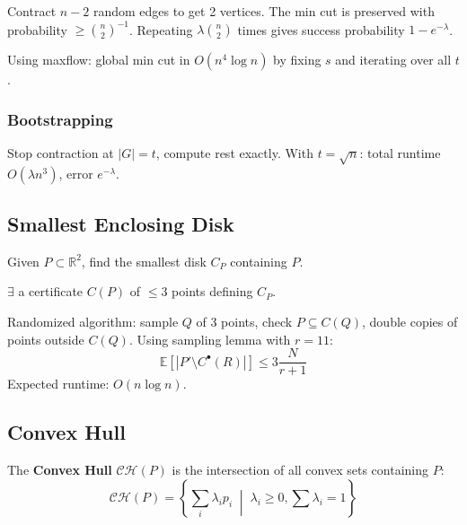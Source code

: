\begin{theorem}
	Contract $n-2$ random edges to get 2 vertices. The min cut is preserved with probability $\geq \binom{n}{2}^{-1}$. Repeating $\lambda \binom{n}{2}$ times gives success probability $1 - e^{-\lambda}$.
\end{theorem}

\begin{theorem}
	Using maxflow: global min cut in $O(n^4 \log n)$ by fixing $s$ and iterating over all $t$.
\end{theorem}

\subsubsection{Bootstrapping}

\begin{theorem}
	Stop contraction at $|G| = t$, compute rest exactly. With $t = \sqrt{n}$: total runtime $O(\lambda n^3)$, error $e^{-\lambda}$.
\end{theorem}

\subsection{Smallest Enclosing Disk}

\begin{definition}
	Given $P \subset \mathbb{R}^2$, find the smallest disk $C_P$ containing $P$.
\end{definition}

\begin{lemma}
	$\exists$ a certificate $C(P)$ of $\leq 3$ points defining $C_P$.
\end{lemma}

\begin{theorem}
	Randomized algorithm: sample $Q$ of 3 points, check $P \subseteq C(Q)$, double copies of points outside $C(Q)$. Using sampling lemma with $r=11$:
	$$\mathbb{E}[|P' \setminus C^{\bullet}(R)|] \le 3\frac{N}{r+1}$$
	Expected runtime: $O(n \log n)$.
\end{theorem}

\subsection{Convex Hull}

\begin{definition}
	The \textbf{Convex Hull} $\mathcal{CH}(P)$ is the intersection of all convex sets containing $P$:
	$$\mathcal{CH}(P) = \left\{ \textstyle\sum_{i} \lambda_i p_i \;\middle|\; \lambda_i \ge 0, \textstyle\sum \lambda_i = 1 \right\}$$
\end{definition}

